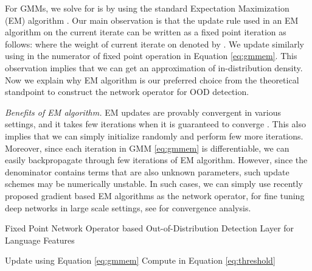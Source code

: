 \documentclass{article}
\newcommand{\Desc}[2]{\State \makebox[10em][l]{#1}#2}
\begin{document}
For GMMs, we solve for  is by using the standard Expectation Maximization (EM) algorithm \cite{murphy2022probabilistic}. Our main observation is that the update rule used in an EM algorithm on the current iterate  can be written as a fixed point iteration as follows:
where the weight of current iterate  on  denoted by . { We update   similarly using  in the numerator of fixed point operation in Equation \eqref{eq:gmmem}.} This observation implies that we can get an approximation of in-distribution density. Now we explain why EM algorithm is our preferred choice from the theoretical standpoint to construct the network operator  for OOD detection.


{\em Benefits of EM algorithm.} EM updates are provably convergent in various settings, and it takes few iterations when it is guaranteed to converge \cite{daskalakis2017ten}. This also implies that we can simply initialize  randomly and perform few more iterations. Moreover, since each iteration in GMM \eqref{eq:gmmem} is differentiable, we can easily backpropagate through few iterations of EM algorithm. However, since the denominator contains terms that are also unknown parameters, such update schemes may be numerically unstable. In such cases, we can simply use recently proposed gradient based  EM algorithms as the network operator, for fine tuning deep networks in large scale settings, see \cite{segol2021improved} for convergence analysis. 

\begin{algorithm}[!tp] 
\caption{Fixed Point Network Operator based Out-of-Distribution Detection  Layer for Language Features }\label{alg:cap}
\begin{algorithmic}
\Input
  \Desc{} 
  \Desc{}
  \Desc{}
  \Desc{ in Equation \eqref{eq:threshold}}
  \Desc{}
  \EndInput
  \Output
  \Desc{}
  \Desc{}
\EndOutput
\While{}
    Update  using Equation  \eqref{eq:gmmem}
\EndWhile
{}
 Compute  in Equation \eqref{eq:threshold}
\end{algorithmic}
\end{algorithm}
\end{document}
